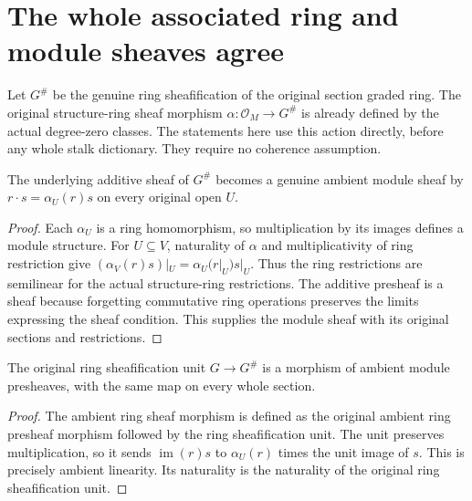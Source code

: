 \section{The whole associated ring and module sheaves agree}

Let $G^{\#}$ be the genuine ring sheafification of the original section
graded ring. The original structure-ring sheaf morphism
$\alpha:\mathcal O_M\to G^{\#}$ is already defined by the actual
degree-zero classes. The statements here use this action directly,
before any whole stalk dictionary. They require no coherence assumption.

\begin{definition}
\label{hir:real-domain-actual-normal-associated-ring-ambient-module-sheaf}
\leanok
The underlying additive sheaf of $G^{\#}$ becomes a genuine ambient
module sheaf by $r\cdot s=\alpha_U(r)s$ on every original open $U$.
\end{definition}
\begin{proof}
Each $\alpha_U$ is a ring homomorphism, so multiplication by its images
defines a module structure. For $U\subseteq V$, naturality of $\alpha$
and multiplicativity of ring restriction give
$(\alpha_V(r)s)|_U=\alpha_U(r|_U)s|_U$. Thus the ring restrictions are
semilinear for the actual structure-ring restrictions. The additive
presheaf is a sheaf because forgetting commutative ring operations
preserves the limits expressing the sheaf condition. This supplies
the module sheaf with its original sections and restrictions.
\end{proof}

\begin{lemma}
\label{hir:real-domain-actual-normal-associated-ring-module-sheaf-unit}
\leanok
The original ring sheafification unit $G\to G^{\#}$ is a morphism
of ambient module presheaves, with the same map on every whole section.
\end{lemma}
\begin{proof}
The ambient ring sheaf morphism is defined as the original ambient
ring presheaf morphism followed by the ring sheafification unit.
The unit preserves multiplication, so it sends
$\operatorname{im}(r)s$ to $\alpha_U(r)$ times the unit image of $s$.
This is precisely ambient linearity. Its naturality is the naturality
of the original ring sheafification unit.
\end{proof}

